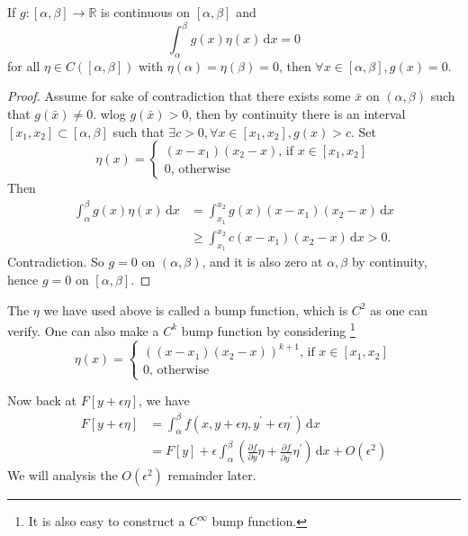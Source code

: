 \documentclass[a4paper]{article}
\begin{document}
\begin{lemma}\label{fund_lemma}
    If $g:[\alpha,\beta]\to\mathbb R$ is continuous on $[\alpha,\beta]$ and
    $$\int_\alpha^\beta g(x)\eta(x)\,\mathrm dx=0$$
    for all $\eta\in C([\alpha,\beta])$ with $\eta(\alpha)=\eta(\beta)=0$, then $\forall x\in [\alpha,\beta],g(x)=0$.
\end{lemma}
\begin{proof}
    Assume for sake of contradiction that there exists some $\bar{x}$ on $(\alpha,\beta)$ such that $g(\bar{x})\neq 0$.
    wlog $g(\bar{x})>0$, then by continuity there is an interval $[x_1,x_2]\subset[\alpha,\beta]$ such that $\exists c>0,\forall x\in [x_1,x_2],g(x)>c$.
    Set
    $$\eta(x)=\begin{cases}
        (x-x_1)(x_2-x)\text{, if $x\in [x_1,x_2]$}\\
        0\text{, otherwise}
    \end{cases}$$
    Then
    \begin{align*}
        \int_\alpha^\beta g(x)\eta(x)\,\mathrm dx
        &=\int_{x_1}^{x_2}g(x)(x-x_1)(x_2-x)\,\mathrm dx\\
        &\ge\int_{x_1}^{x_2}c(x-x_1)(x_2-x)\,\mathrm dx>0.
    \end{align*}
    Contradiction.
    So $g=0$ on $(\alpha,\beta)$, and it is also zero at $\alpha,\beta$ by continuity, hence $g=0$ on $[\alpha,\beta]$.
\end{proof}
\begin{remark}
    The $\eta$ we have used above is called a bump function, which is $C^2$ as one can verify.
    One can also make a $C^k$ bump function by considering
    \footnote{It is also easy to construct a $C^{\infty}$ bump function.}
    $$\eta(x)=\begin{cases}
    ((x-x_1)(x_2-x))^{k+1}\text{, if $x\in [x_1,x_2]$}\\
    0\text{, otherwise}
\end{cases}$$
\end{remark}
Now back at $F[y+\epsilon\eta]$, we have
\begin{align*}
    F[y+\epsilon\eta]&=\int_\alpha^\beta f(x,y+\epsilon\eta,y^\prime+\epsilon\eta^\prime)\,\mathrm dx\\
    &=F[y]+\epsilon\int_\alpha^\beta\left( \frac{\partial f}{\partial y}\eta+\frac{\partial f}{\partial y^\prime}\eta^\prime \right)\,\mathrm dx+O(\epsilon^2)
\end{align*}
We will analysis the $O(\epsilon^2)$ remainder later.
\end{document}
